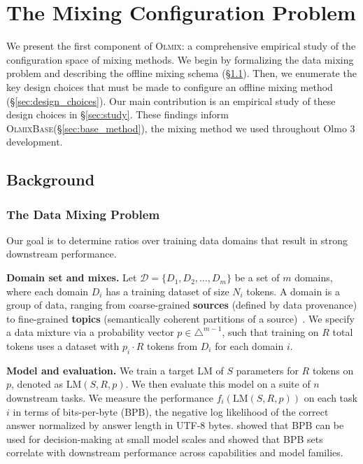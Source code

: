 \documentclass[table]{ai2style/ai2}
\newcommand{\D}[0]{\mathcal{D}}
\newcommand{\olmix}{\textsc{Olmix}\xspace}
\newcommand{\LM}[0]{\text{LM}}
\newcommand{\base}[0]{\textsc{OlmixBase}\xspace}
\begin{document}
\section{The Mixing Configuration Problem}
\label{sec:config-choices}

We present the first component of \olmix: a comprehensive empirical study of the configuration space of mixing methods. We begin by formalizing the data mixing problem and describing the offline mixing schema (\S\ref{sec:background}). Then, we enumerate the key design choices that must be made to configure an offline mixing method (\S\ref{sec:design_choices}).
Our main contribution is an empirical study of these design choices in \S\ref{sec:study}. 
These findings inform \base (\S\ref{sec:base_method}), the mixing method we used throughout Olmo 3 development.

\subsection{Background}\label{sec:background}

\subsubsection{The Data Mixing Problem}\label{sec:setup_1}

Our goal is to determine ratios over training data domains that result in strong downstream performance.

\textbf{Domain set and mixes.} Let $\D = \{D_1, D_2, \dots, D_m \}$ be a set of $m$ domains, where each domain $D_i$ has a training dataset of size $N_i$ tokens. A domain is a group of data, ranging from coarse-grained \textbf{sources} (defined by data provenance) to fine-grained \textbf{topics} (semantically coherent partitions of a source)~\citep{wettig2025organizewebconstructingdomains}.
We specify a data mixture via a probability vector $p \in \triangle^{m-1}$, such that training on $R$ total tokens uses a dataset with $p_i \cdot R$ tokens from $D_i$ for each domain $i$.

\textbf{Model and evaluation.} We train a target LM of $S$ parameters for $R$ tokens on $p$, denoted as $\LM(S, R, p)$.
We then evaluate this model on a suite of $n$ downstream tasks. 
We measure the performance $f_i(\LM(S, R, p))$ on each task $i$ in terms of bits-per-byte (BPB), the negative log likelihood of the correct answer normalized by answer length in UTF-8 bytes. \citet{heineman2025signalnoiseframeworkreducing} showed that BPB can be used for decision-making at small model scales and \citet{huang2024compression} showed that BPB sets correlate with downstream performance across capabilities and model families.
\end{document}
